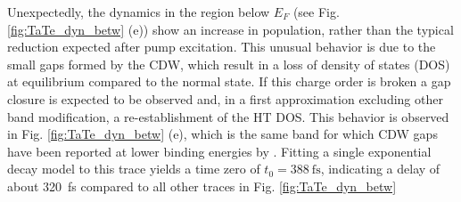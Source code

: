 Unexpectedly, the dynamics in the region below $E_F$ (see Fig. \ref{fig:TaTe_dyn_betw} (e)) show an increase in population, rather than the typical reduction expected after pump excitation.
This unusual behavior is due to the small gaps formed by the CDW, which result in a loss of density of states (DOS) at equilibrium compared to the normal state.
If this charge order is broken a gap closure is expected to be observed and, in a first approximation excluding other band modification, a re-establishment of the HT DOS.
This behavior is observed in Fig. \ref{fig:TaTe_dyn_betw} (e), which is the same band for which CDW gaps have been reported at lower binding energies by \cite{lin_evidence_2022}.
Fitting a single exponential decay model to this trace yields a time zero of $t_0=\qty{388}{\femto\second}$, indicating a delay of about \qty{320}{\femto\second} compared to all other traces in Fig. \ref{fig:TaTe_dyn_betw}

